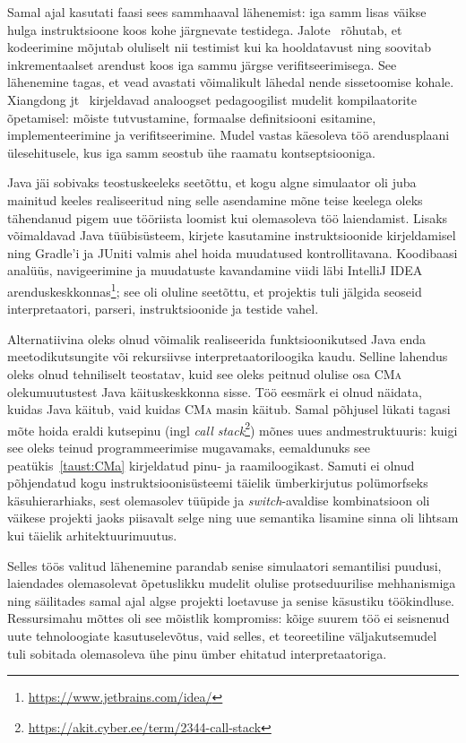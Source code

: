 Samal ajal kasutati faasi sees sammhaaval lähenemist: iga samm lisas väikse hulga instruktsioone koos kohe järgnevate testidega. Jalote~\cite{jalote_coding_2025} rõhutab, et kodeerimine mõjutab oluliselt nii testimist kui ka hooldatavust ning soovitab inkrementaalset arendust koos iga sammu järgse verifitseerimisega. See lähenemine tagas, et vead avastati võimalikult lähedal nende sissetoomise kohale. Xiangdong jt~\cite{xiangdong_effective_2023} kirjeldavad analoogset pedagoogilist mudelit kompilaatorite õpetamisel: mõiste tutvustamine, formaalse definitsiooni esitamine, implementeerimine ja verifitseerimine. Mudel vastas käesoleva töö arendusplaani ülesehitusele, kus iga samm seostub ühe raamatu kontseptsiooniga.

Java jäi sobivaks teostuskeeleks seetõttu, et kogu algne simulaator oli juba mainitud keeles realiseeritud ning selle asendamine mõne teise keelega oleks tähendanud pigem uue tööriista loomist kui olemasoleva töö laiendamist. Lisaks võimaldavad Java tüübisüsteem, kirjete kasutamine instruktsioonide kirjeldamisel ning Gradle'i ja JUniti valmis ahel hoida muudatused kontrollitavana. Koodibaasi analüüs, navigeerimine ja muudatuste kavandamine viidi läbi IntelliJ IDEA arenduskeskkonnas\footnote{\url{https://www.jetbrains.com/idea/}}; see oli oluline seetõttu, et projektis tuli jälgida seoseid interpretaatori, parseri, instruktsioonide ja testide vahel.

Alternatiivina oleks olnud võimalik realiseerida funktsioonikutsed Java enda meetodikutsungite või rekursiivse interpretaatoriloogika kaudu. Selline lahendus oleks olnud tehniliselt teostatav, kuid see oleks peitnud olulise osa \textsc{CMa} olekumuutustest Java käituskeskkonna sisse. Töö eesmärk ei olnud näidata, kuidas Java käitub, vaid kuidas \textsc{CMa} masin käitub. Samal põhjusel lükati tagasi mõte hoida eraldi kutsepinu (ingl \emph{call stack}\footnote{\url{https://akit.cyber.ee/term/2344-call-stack}}) mõnes uues andmestruktuuris: kuigi see oleks teinud programmeerimise mugavamaks, eemaldunuks see peatükis~\ref{taust:CMa} kirjeldatud pinu- ja raamiloogikast. Samuti ei olnud põhjendatud kogu instruktsioonisüsteemi täielik ümberkirjutus polümorfseks käsuhierarhiaks, sest olemasolev tüüpide ja \emph{switch}-avaldise kombinatsioon oli väikese projekti jaoks piisavalt selge ning uue semantika lisamine sinna oli lihtsam kui täielik arhitektuurimuutus.

Selles töös valitud lähenemine parandab senise simulaatori semantilisi puudusi, laiendades olemasolevat õpetuslikku mudelit olulise protseduurilise mehhanismiga ning säilitades samal ajal algse projekti loetavuse ja senise käsustiku töökindluse. Ressursimahu mõttes oli see mõistlik kompromiss: kõige suurem töö ei seisnenud uute tehnoloogiate kasutuselevõtus, vaid selles, et teoreetiline väljakutsemudel tuli sobitada olemasoleva ühe pinu ümber ehitatud interpretaatoriga.

